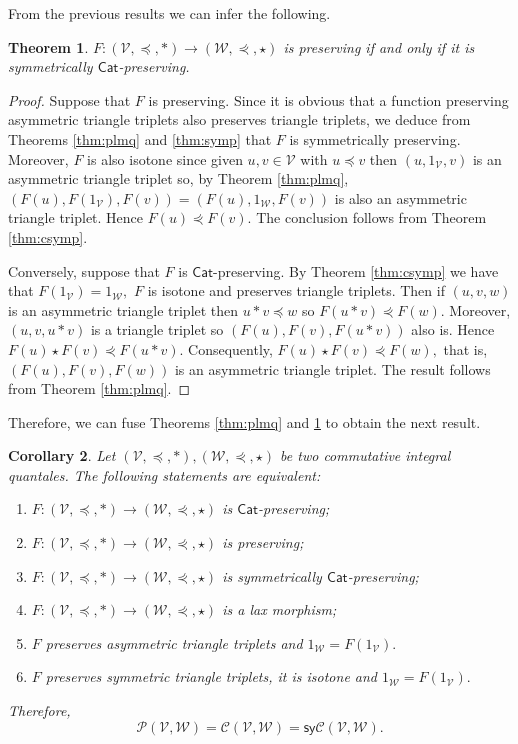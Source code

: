 \documentclass[11pt,a4paper]{amsart}
\newtheorem{theorem}{Theorem}[section]
\newtheorem{corollary}[theorem]{Corollary}
\theoremstyle{definition}
\begin{document}
	From the previous results we can infer the following.
	
	\begin{theorem}\label{thm:psCp}
		$F:(\mathscr{V},\preceq,\ast)\to(\mathscr{W},\curlyeqprec,\star)$ is preserving if and only if it is symmetrically $\mathsf{Cat}$-preserving.
	\end{theorem}
	
	\begin{proof}
		Suppose that $F$ is preserving. Since it is obvious that a function preserving asymmetric triangle triplets also preserves triangle triplets, we deduce from Theorems \ref{thm:plmq} and \ref{thm:symp} that $F$ is symmetrically preserving. Moreover, $F$ is also isotone since given $u,v\in \mathscr{V}$ with $u\preceq v$ then $(u,1_\mathscr{V},v)$ is an asymmetric triangle triplet so, by Theorem \ref{thm:plmq}, $(F(u),F(1_\mathscr{V}),F(v))=(F(u),1_\mathscr{W},F(v))$ is also an asymmetric triangle triplet. Hence $F(u)\curlyeqprec F(v).$ The conclusion follows from Theorem \ref{thm:csymp}.
		
		Conversely, suppose that $F$ is $\mathsf{Cat}$-preserving. By Theorem \ref{thm:csymp} we have that $F(1_\mathscr{V})=1_\mathscr{W},$ $F$ is isotone and preserves triangle triplets. Then if $(u,v,w)$ is an asymmetric triangle triplet then $u\ast v\preceq w$ so $F(u\ast v)\curlyeqprec F(w).$ Moreover, $(u,v,u\ast v)$ is a triangle triplet so $(F(u),F(v),F(u\ast v))$ also is. Hence $F(u)\star F(v)\curlyeqprec F(u\ast v).$ Consequently, $F(u)\star F(v)\curlyeqprec F(w),$ that is, $(F(u),F(v),F(w))$ is an asymmetric triangle triplet. The result follows from Theorem \ref{thm:plmq}.
	\end{proof}
	
	Therefore, we can fuse Theorems \ref{thm:plmq} and \ref{thm:psCp} to obtain the next result.
	
	\begin{corollary}\label{cor:preserving_spreserving}
		Let $(\mathscr{V},\preceq,\ast),(\mathscr{W},\curlyeqprec,\star)$ be two commutative integral quantales. The following statements are equivalent:
		\begin{enumerate}[(1)]
			\item $F:(\mathscr{V},\preceq,\ast)\to(\mathscr{W},\curlyeqprec,\star)$ is $\mathsf{Cat}$-preserving; 
			\item  $F:(\mathscr{V},\preceq,\ast)\to(\mathscr{W},\curlyeqprec,\star)$ is preserving; 
			\item $F:(\mathscr{V},\preceq,\ast)\to(\mathscr{W},\curlyeqprec,\star)$ is symmetrically $\mathsf{Cat}$-preserving; 
			\item $F:(\mathscr{V},\preceq,\ast)\to(\mathscr{W},\curlyeqprec,\star)$ is a lax morphism;
			\item $F$ preserves asymmetric triangle triplets and $1_\mathscr{W}=F(1_\mathscr{V}).$
			\item $F$ preserves symmetric triangle triplets, it is isotone and $1_\mathscr{W}=F(1_\mathscr{V}).$
		\end{enumerate}
		Therefore,
		$$\mathscr{P}(\mathscr{V},\mathscr{W})=\mathscr{C}(\mathscr{V},\mathscr{W})=\mathsf{sy}\mathscr{C}(\mathscr{V},\mathscr{W}).$$
	\end{corollary}
	
\end{document}
